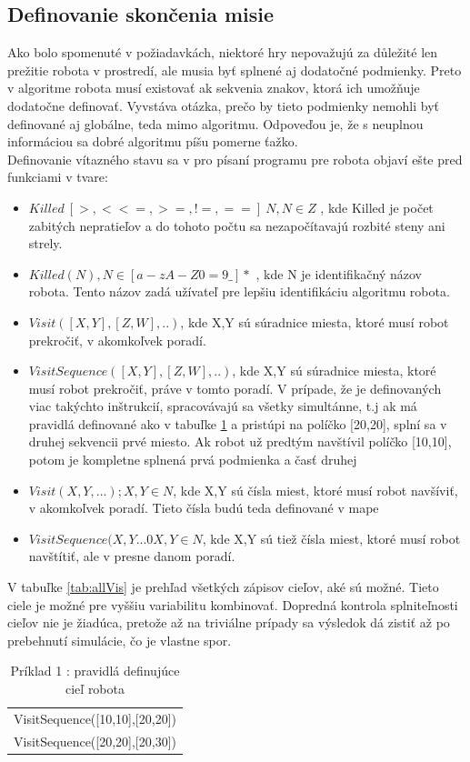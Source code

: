\subsection{ Definovanie skončenia misie }
Ako bolo spomenuté v požiadavkách, niektoré hry nepovažujú za důležité len prežitie robota v prostredí, ale musia byť splnené aj dodatočné podmienky. Preto v algoritme robota musí existovať ak sekvenia znakov, ktorá ich umožňuje dodatočne definovať. Vyvstáva otázka, prečo by tieto podmienky nemohli byť definované aj globálne, teda mimo algoritmu. Odpoveďou je, že s neuplnou informáciou sa dobré algoritmu píšu pomerne ťažko.\\%
Definovanie vítazného stavu sa v pro písaní programu pre robota objaví ešte pred funkciami v tvare:
\begin{itemize}
\item $Killed\ [>, < <=, >=, !=, ==]\ N, N \in Z$ , kde Killed je počet zabitých nepratieľov a do tohoto počtu sa nezapočítavajú rozbité steny ani strely.
\item $Killed( N ), N \in [a-zA-Z0=9\_]*$ , kde N je identifikačný názov robota. Tento názov zadá užívateľ pre lepšiu identifikáciu algoritmu robota.
\item $Visit([X,Y], [Z,W],..)$, kde X,Y sú súradnice miesta, ktoré musí robot prekročiť, v akomkoľvek poradí.
\item $VisitSequence([X,Y], [Z,W],..)$, kde X,Y sú súradnice miesta, ktoré musí robot prekročiť, práve v tomto poradí. V prípade, že je definovaných viac takýchto inštrukcií, spracovávajú sa všetky simultánne, t.j ak má pravidlá definované ako v tabuľke \ref{tab:pr1} a pristúpi na políčko [20,20], splní sa v druhej sekvencii prvé miesto. Ak robot už predtým navštívil políčko [10,10], potom je kompletne splnená prvá podmienka a časť druhej
\item $Visit(X, Y,...); X,Y \in N $, kde X,Y sú čísla miest, ktoré musí robot navšíviť, v akomkoľvek poradí. Tieto čísla budú teda definované v mape
\item $VisitSequence(X,Y...0 X,Y \in N$, kde X,Y sú tiež čísla miest, ktoré musí robot navštítiť, ale v presne danom poradí.
\end{itemize}
V tabuľke \ref{tab:allVis} je prehľad všetkých zápisov cieľov, aké sú možné. Tieto ciele je možné pre vyššiu variabilitu kombinovať. Dopredná kontrola splniteľnosti cieľov nie je žiadúca, pretože až na triviálne prípady sa výsledok dá zistiť až po prebehnutí simulácie, čo je vlastne spor.
\begin{table}
\centering
\begin{tabular}{l}
VisitSequence([10,10],[20,20])\\
VisitSequence([20,20],[20,30])\\
\end{tabular}
\caption {Príklad 1 : pravidlá definujúce cieľ robota} %
\label{tab:pr1}
\end{table}


